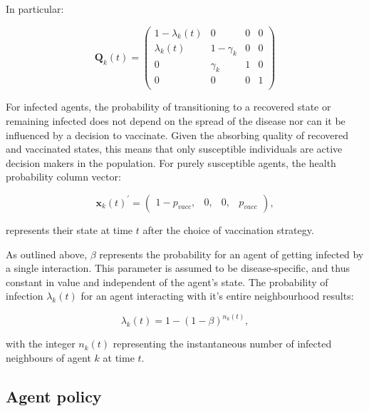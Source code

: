 \documentclass[11pt]{article}
\begin{document}
In particular: 

\begin{equation}\label{eq:3}			%
	 \mathbf{Q}_k(t) = 
	 \left (\begin{array}{cccc} 1-\lambda_{k}(t)&0&0&0 \\
	 	\lambda_{k}(t)&1-\gamma_{k}&0&0 \\
		0&\gamma_{k}&1&0 \\
		0&0&0&1 \\
	  \end{array} \right)
\end{equation}

For infected agents, the probability of transitioning to a recovered state or remaining infected does not depend on the spread of the disease nor can it be influenced by a decision to vaccinate. Given the absorbing quality of recovered and vaccinated states, this means that only susceptible individuals are active decision makers in the population. For purely susceptible agents, the health probability column vector:

\begin{equation}\label{eq:4}
	\mathbf{x}_k(t)^{'}=\left(\begin{array}{cccc} 1-p_{vacc},&0,&0,&p_{vacc}  \end{array} \right),
\end{equation} 

represents their state at time \(t\) after the choice of vaccination strategy. 


As outlined above, \(\beta\) represents the probability for an agent of getting infected by a single interaction. This parameter is assumed to be disease-specific, and thus constant in value and independent of the agent's state. The probability of infection \(\lambda_{k}(t)\) for an agent interacting with it's entire neighbourhood results:

\begin{equation}\label{eq:5}
	\lambda_{k}(t)=1-(1-\beta)^{n_{k}(t)},
\end{equation}

with the integer \(n_{k}(t)\) representing the instantaneous number of infected neighbours of agent \(k\) at time \(t\). %

\subsection{Agent policy}
\end{document}
